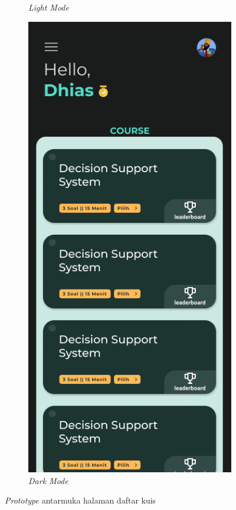 \begin{figure}[H]
\begin{subfigure}[b]{0.3\textwidth}
	  \caption{\textit{Light Mode}}
	  \label{fig:HasilQuizList}
	\end{subfigure}
	\begin{subfigure}[b]{0.3\textwidth}
		\centering
	  \includegraphics[width=\linewidth]{contents/chapter-3/images/HF-QuizList-dt.png}
	  \caption{\textit{Dark Mode}}
	  \label{fig:HasilQuizList2}
	\end{subfigure}
	\caption{\textit{Prototype} antarmuka halaman daftar kuis}
	\label{Fig:HasilFeatureSetQuizListt}
\end{figure}
